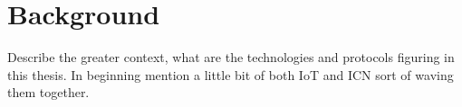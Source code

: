 \section{Background}

Describe the greater context, what are the technologies and protocols figuring in this thesis.
In beginning mention a little bit of both IoT and ICN sort of waving them together.









